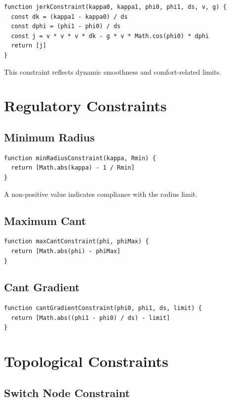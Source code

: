 \begin{verbatim}
function jerkConstraint(kappa0, kappa1, phi0, phi1, ds, v, g) {
  const dk = (kappa1 - kappa0) / ds
  const dphi = (phi1 - phi0) / ds
  const j = v * v * v * dk - g * v * Math.cos(phi0) * dphi
  return [j]
}
\end{verbatim}

This constraint reflects dynamic smoothness and comfort-related limits.

\section{Regulatory Constraints}

\subsection{Minimum Radius}

\begin{verbatim}
function minRadiusConstraint(kappa, Rmin) {
  return [Math.abs(kappa) - 1 / Rmin]
}
\end{verbatim}

A non-positive value indicates compliance with the radius limit.

\subsection{Maximum Cant}

\begin{verbatim}
function maxCantConstraint(phi, phiMax) {
  return [Math.abs(phi) - phiMax]
}
\end{verbatim}

\subsection{Cant Gradient}

\begin{verbatim}
function cantGradientConstraint(phi0, phi1, ds, limit) {
  return [Math.abs((phi1 - phi0) / ds) - limit]
}
\end{verbatim}

\section{Topological Constraints}

\subsection{Switch Node Constraint}


